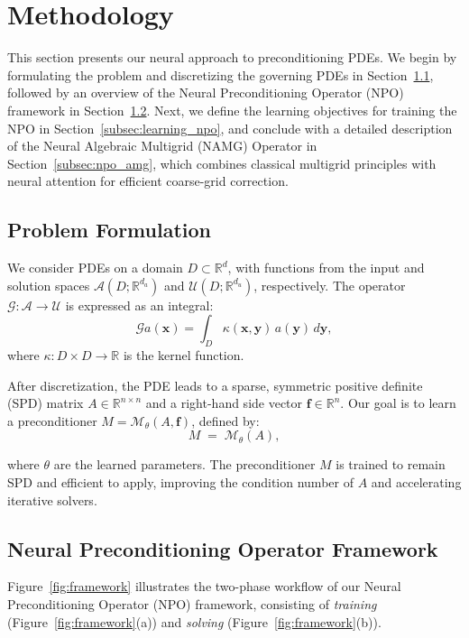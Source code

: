 

\section{Methodology}
This section presents our neural approach to preconditioning PDEs. We begin by formulating the problem and discretizing the governing PDEs in Section~\ref{subsec:problem_formulation}, followed by an overview of the Neural Preconditioning Operator (NPO) framework in Section~\ref{subsec:npo_framework}. Next, we define the learning objectives for training the NPO in Section~\ref{subsec:learning_npo}, and conclude with a detailed description of the Neural Algebraic Multigrid (NAMG) Operator in Section~\ref{subsec:npo_amg}, which combines classical multigrid principles with neural attention for efficient coarse-grid correction.

\subsection{Problem Formulation}
\label{subsec:problem_formulation}
We consider PDEs on a domain \(D \subset \mathbb{R}^d\), with functions from the input and solution spaces \(\mathcal{A}(D; \mathbb{R}^{d_a})\) and \(\mathcal{U}(D; \mathbb{R}^{d_u})\), respectively. The operator \(\mathcal{G}: \mathcal{A} \to \mathcal{U}\) is expressed as an integral:
\begin{equation}
    \mathcal{G}a(\mathbf{x}) = \int_{D} \kappa(\mathbf{x}, \mathbf{y}) \, a(\mathbf{y}) \, d\mathbf{y},
\end{equation}
where \(\kappa: D \times D \to \mathbb{R}\) is the kernel function.

After discretization, the PDE leads to a sparse, symmetric positive definite (SPD) matrix \(A \in \mathbb{R}^{n \times n}\) and a right-hand side vector \(\mathbf{f} \in \mathbb{R}^n\). Our goal is to learn a preconditioner \(M = \mathcal{M}_{\theta}(A, \mathbf{f})\), defined by:
\begin{equation}
    M \;=\; \mathcal{M}_{\theta}(A),
\end{equation}

where \(\theta\) are the learned parameters. The preconditioner \(M\) is trained to remain SPD and efficient to apply, improving the condition number of \(A\) and accelerating iterative solvers.

\subsection{Neural Preconditioning Operator Framework}
\label{subsec:npo_framework}
Figure~\ref{fig:framework} illustrates the two-phase workflow of our Neural Preconditioning Operator (NPO) framework, consisting of \emph{training} (Figure~\ref{fig:framework}(a)) and \emph{solving} (Figure~\ref{fig:framework}(b)). 

